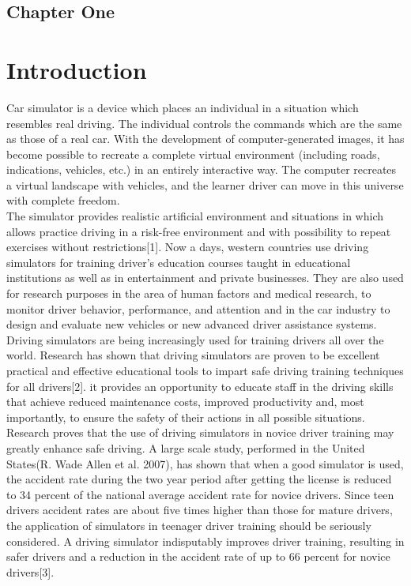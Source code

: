 \documentclass[12pt,a4paper]{article}
\begin{document}
\label{key}
\newpage


\begin{center}
\section *{Chapter One }
\end{center}
\section {Introduction}

Car simulator is a device which places an individual in a situation which resembles real driving. The individual controls the commands which are the same as those of a real car. With the development of computer-generated images, it has become possible to recreate a complete virtual environment (including roads, indications, vehicles, etc.) in an entirely interactive way. The computer recreates a virtual landscape with vehicles, and the learner driver can move in this universe with complete freedom.\\

The simulator provides realistic artificial environment and situations in which allows practice driving in a risk-free environment and with possibility to repeat exercises without restrictions[1]. Now a days, western countries use driving simulators for training driver's education courses taught in educational institutions as well as in entertainment and private businesses. They are also used for research purposes in the area of human factors and medical research, to monitor driver behavior, performance, and attention and in the car industry to design and evaluate new vehicles or new advanced driver assistance systems.\\

Driving simulators are being increasingly used for training drivers all over the world. Research has shown that driving simulators are proven to be excellent practical and effective educational tools to impart safe driving training techniques for all drivers[2].  it provides an opportunity to educate staff in the driving skills that achieve reduced maintenance costs, improved productivity and, most importantly, to ensure the safety of their actions in all possible situations.\\

Research proves that the use of driving simulators in novice driver training may greatly enhance safe driving. A large scale study, performed in the United States(R. Wade Allen et al. 2007), has shown that when a good simulator is used, the accident rate during the two year period after getting the license is reduced to 34 percent of the national average accident rate for novice drivers. Since teen drivers accident rates are about five times higher than those for mature drivers, the application of simulators in teenager driver training should be seriously considered. A driving simulator indisputably improves driver training, resulting in safer drivers and a reduction in the accident rate of up to 66 percent for novice drivers[3].\\
\end{document}
